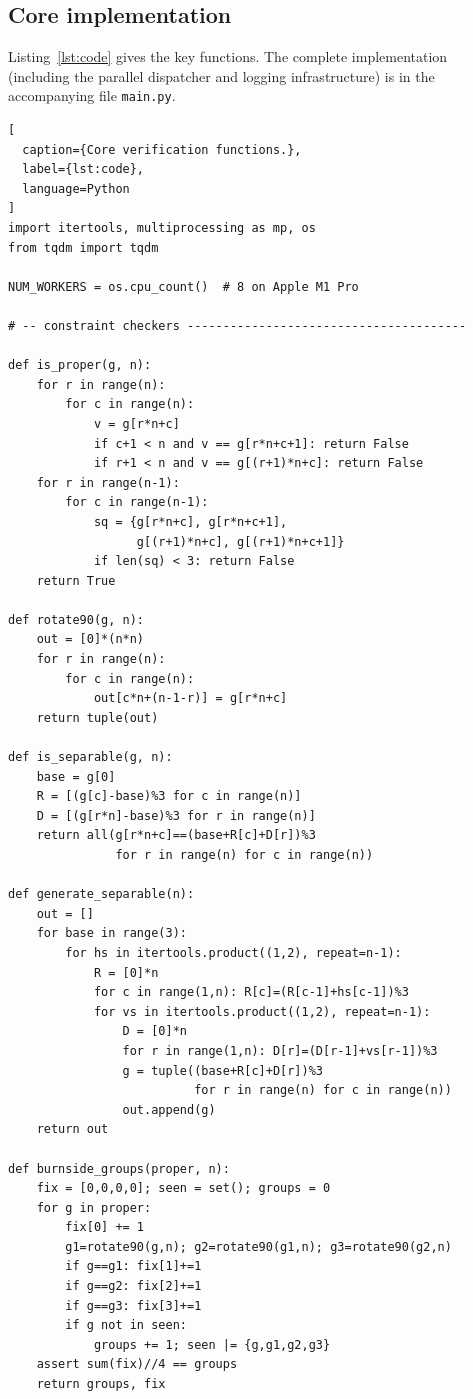 \documentclass{article}
\begin{document}
\subsection{Core implementation}

Listing~\ref{lst:code} gives the key functions.
The complete implementation (including the parallel
dispatcher and logging infrastructure) is in the
accompanying file \texttt{main.py}.

\begin{lstlisting}[
  caption={Core verification functions.},
  label={lst:code},
  language=Python
]
import itertools, multiprocessing as mp, os
from tqdm import tqdm

NUM_WORKERS = os.cpu_count()  # 8 on Apple M1 Pro

# -- constraint checkers ---------------------------------------

def is_proper(g, n):
    for r in range(n):
        for c in range(n):
            v = g[r*n+c]
            if c+1 < n and v == g[r*n+c+1]: return False
            if r+1 < n and v == g[(r+1)*n+c]: return False
    for r in range(n-1):
        for c in range(n-1):
            sq = {g[r*n+c], g[r*n+c+1],
                  g[(r+1)*n+c], g[(r+1)*n+c+1]}
            if len(sq) < 3: return False
    return True

def rotate90(g, n):
    out = [0]*(n*n)
    for r in range(n):
        for c in range(n):
            out[c*n+(n-1-r)] = g[r*n+c]
    return tuple(out)

def is_separable(g, n):
    base = g[0]
    R = [(g[c]-base)%3 for c in range(n)]
    D = [(g[r*n]-base)%3 for r in range(n)]
    return all(g[r*n+c]==(base+R[c]+D[r])%3
               for r in range(n) for c in range(n))

def generate_separable(n):
    out = []
    for base in range(3):
        for hs in itertools.product((1,2), repeat=n-1):
            R = [0]*n
            for c in range(1,n): R[c]=(R[c-1]+hs[c-1])%3
            for vs in itertools.product((1,2), repeat=n-1):
                D = [0]*n
                for r in range(1,n): D[r]=(D[r-1]+vs[r-1])%3
                g = tuple((base+R[c]+D[r])%3
                          for r in range(n) for c in range(n))
                out.append(g)
    return out

def burnside_groups(proper, n):
    fix = [0,0,0,0]; seen = set(); groups = 0
    for g in proper:
        fix[0] += 1
        g1=rotate90(g,n); g2=rotate90(g1,n); g3=rotate90(g2,n)
        if g==g1: fix[1]+=1
        if g==g2: fix[2]+=1
        if g==g3: fix[3]+=1
        if g not in seen:
            groups += 1; seen |= {g,g1,g2,g3}
    assert sum(fix)//4 == groups
    return groups, fix


\end{lstlisting}
\end{document}
